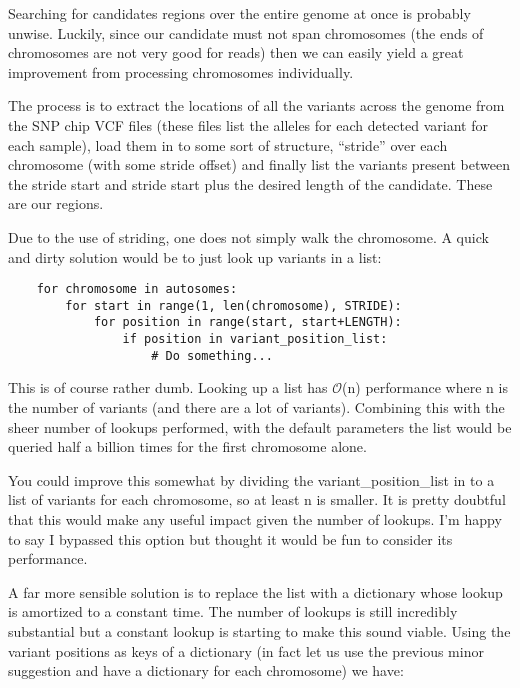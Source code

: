 Searching for candidates regions over the entire genome at once is probably
unwise. Luckily, since our candidate must not span chromosomes (the ends of
chromosomes are not very good for reads) then we can easily yield a great
improvement from processing chromosomes individually.

The process is to extract the locations of all the variants across the genome
from the SNP chip VCF files (these files list the alleles for each detected
variant for each sample), load them in to some sort of structure, “stride” over
each chromosome (with some stride offset) and finally list the variants present
between the stride start and stride start plus the desired length of the
candidate. These are our regions.

Due to the use of striding, one does not simply walk the chromosome. A quick
and dirty solution would be to just look up variants in a list:

\begin{verbatim}
    for chromosome in autosomes:
        for start in range(1, len(chromosome), STRIDE):
            for position in range(start, start+LENGTH):
                if position in variant_position_list:
                    # Do something...
\end{verbatim}

This is of course rather dumb. Looking up a list has $\mathcal{O}$(n) performance
where n is the number of variants (and there are a lot of variants). Combining
this with the sheer number of lookups performed, with the default parameters the
list would be queried half a billion times for the first chromosome alone.

You could improve this somewhat by dividing the variant\_position\_list in to a
list of variants for each chromosome, so at least n is smaller. It is pretty
doubtful that this would make any useful impact given the number of lookups.
I’m happy to say I bypassed this option but thought it would be fun to consider
its performance.

A far more sensible solution is to replace the list with a dictionary
whose lookup is amortized to a constant time. The number of lookups is still
incredibly substantial but a constant lookup is starting to make this sound
viable. Using the variant positions as keys of a dictionary (in fact let us use
the previous minor suggestion and have a dictionary for each chromosome) we
have:


